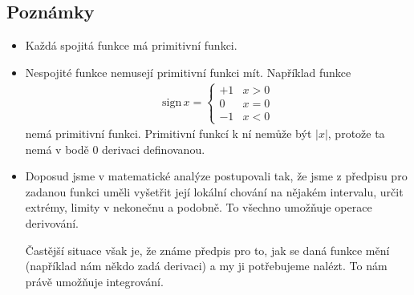 \subsection*{Poznámky}

\begin{itemize}
    \item Každá spojitá funkce má primitivní funkci.
    \item Nespojité funkce nemusejí primitivní funkci mít. Například funkce 
    \begin{align}
        \mathrm{sign}\, x = \begin{cases}
            +1 & x>0 \\
            0 & x=0 \\
            -1 & x<0
        \end{cases}
    \end{align}
    nemá primitivní funkci. Primitivní funkcí k ní nemůže být $|x|$, protože ta nemá v bodě $0$ derivaci definovanou.

    \item Doposud jsme v matematické analýze postupovali tak, že jsme z předpisu pro zadanou funkci uměli vyšetřit její lokální chování na nějakém intervalu, určit extrémy, limity v nekonečnu a podobně. To všechno umožňuje operace derivování.
    
    Častější situace však je, že známe předpis pro to, jak se daná funkce mění (například nám někdo zadá derivaci) a my ji potřebujeme nalézt. To nám právě umožňuje integrování.
\end{itemize}